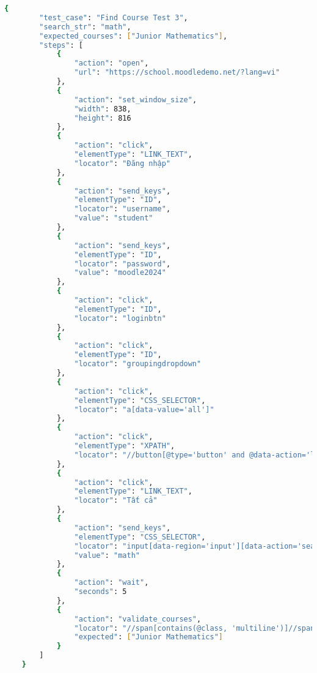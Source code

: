 \begin{lstlisting}[language=bash, caption={Ví dụ testcase FC-001-0003 ở level 2}]
    {
        "test_case": "Find Course Test 3",
        "search_str": "math",
        "expected_courses": ["Junior Mathematics"],
        "steps": [
            {
                "action": "open",
                "url": "https://school.moodledemo.net/?lang=vi"
            },
            {
                "action": "set_window_size",
                "width": 838,
                "height": 816
            },
            {
                "action": "click",
                "elementType": "LINK_TEXT",
                "locator": "Đăng nhập"
            },
            {
                "action": "send_keys",
                "elementType": "ID",
                "locator": "username",
                "value": "student"
            },
            {
                "action": "send_keys",
                "elementType": "ID",
                "locator": "password",
                "value": "moodle2024"
            },
            {
                "action": "click",
                "elementType": "ID",
                "locator": "loginbtn"
            },
            {
                "action": "click",
                "elementType": "ID",
                "locator": "groupingdropdown"
            },
            {
                "action": "click",
                "elementType": "CSS_SELECTOR",
                "locator": "a[data-value='all']"
            },
            {
                "action": "click",
                "elementType": "XPATH",
                "locator": "//button[@type='button' and @data-action='limit-toggle']"
            },
            {
                "action": "click",
                "elementType": "LINK_TEXT",
                "locator": "Tất cả"
            },
            {
                "action": "send_keys",
                "elementType": "CSS_SELECTOR",
                "locator": "input[data-region='input'][data-action='search']",
                "value": "math"
            },
            {
                "action": "wait",
                "seconds": 5
            },
            {
                "action": "validate_courses",
                "locator": "//span[contains(@class, 'multiline')]//span[@class='sr-only']",
                "expected": ["Junior Mathematics"]
            }
        ]
    }
\end{lstlisting}